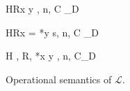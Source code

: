 \begin{figure}
\begin{minipage}{\textwidth}
\begin{minipage}{0.5\textwidth}
{\langle H\coma R\coma  *x \leftarrow y , n, C\rangle
  \longrightarrow_{D} \MEMEX }
\end{minipage}
\begin{minipage}{0.5\textwidth}
{\langle H\coma R\coma  \LET x = *y \; \IN s, n, C\rangle
    \longrightarrow_{D} \MEMEX}
\end{minipage}
\vspace{2mm}

{ \langle H , R, *x \leftarrow y , n, C\rangle \xlongrightarrow{}_{D}
  \CONSTEX}



\end{minipage}

\caption{Operational semantics of \(\mathcal{L}\).}
\label{fig:transitionRules}
\end{figure}

